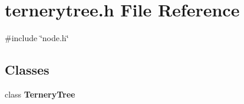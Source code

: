 \section{ternerytree.\-h \-File \-Reference}
\label{ternerytree_8h}
{\ttfamily \#include \char`\"{}node.\-h\char`\"{}}\*
\subsection*{\-Classes}
\begin{DoxyCompactItemize}
\item 
class {\bf \-Ternery\-Tree}
\end{DoxyCompactItemize}
